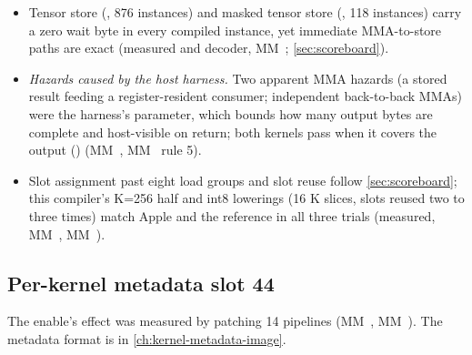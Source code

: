 \begin{itemize}
  MM~, MM~).
\item Tensor store (, 876 instances) and masked tensor store (, 118 instances) carry a
  zero wait byte in every compiled instance, yet immediate MMA-to-store paths are exact (measured and decoder, MM~; \cref{sec:scoreboard}).
\item \emph{Hazards caused by the host harness.} Two apparent MMA hazards (a stored result feeding a register-resident consumer;
  independent back-to-back MMAs) were the harness's  parameter, which bounds how many output bytes are complete
  and host-visible on return; both kernels pass when it covers the output () (MM~, MM~ rule 5).
\item Slot assignment past eight load groups and slot reuse follow \cref{sec:scoreboard}; this compiler's K=256 half and int8
  lowerings (16 K slices, slots reused two to three times) match Apple and the reference in all three trials (measured,
  MM~, MM~).
\end{itemize}

\subsection*{Per-kernel metadata slot 44}

The enable's effect was measured by patching 14 pipelines (MM~, MM~). The metadata format is in
\cref{ch:kernel-metadata-image}.

